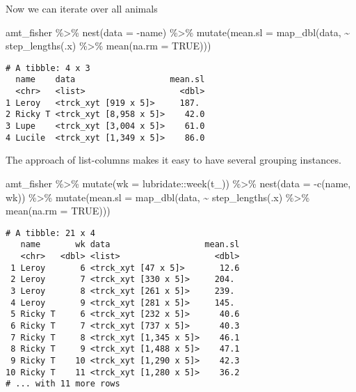 \documentclass[ignorenonframetext,,t]{beamer}
\newenvironment{Shaded}{\begin{snugshade}}{\end{snugshade}}
\newcommand{\AttributeTok}[1]{\textcolor[rgb]{0.77,0.63,0.00}{#1}}
\newcommand{\ConstantTok}[1]{\textcolor[rgb]{0.00,0.00,0.00}{#1}}
\newcommand{\FunctionTok}[1]{\textcolor[rgb]{0.00,0.00,0.00}{#1}}
\newcommand{\NormalTok}[1]{#1}
\newcommand{\SpecialCharTok}[1]{\textcolor[rgb]{0.00,0.00,0.00}{#1}}
\begin{document}
\begin{frame}[fragile]
Now we can iterate over all animals

\begin{Shaded}
\begin{Highlighting}[]
\NormalTok{amt\_fisher }\SpecialCharTok{\%\textgreater{}\%} \FunctionTok{nest}\NormalTok{(}\AttributeTok{data =} \SpecialCharTok{{-}}\NormalTok{name) }\SpecialCharTok{\%\textgreater{}\%} 
  \FunctionTok{mutate}\NormalTok{(}\AttributeTok{mean.sl =} \FunctionTok{map\_dbl}\NormalTok{(data, }\SpecialCharTok{\textasciitilde{}} \FunctionTok{step\_lengths}\NormalTok{(.x) }\SpecialCharTok{\%\textgreater{}\%} 
                             \FunctionTok{mean}\NormalTok{(}\AttributeTok{na.rm =} \ConstantTok{TRUE}\NormalTok{)))}
\end{Highlighting}
\end{Shaded}

\begin{verbatim}
# A tibble: 4 x 3
  name    data                   mean.sl
  <chr>   <list>                   <dbl>
1 Leroy   <trck_xyt [919 x 5]>     187. 
2 Ricky T <trck_xyt [8,958 x 5]>    42.0
3 Lupe    <trck_xyt [3,004 x 5]>    61.0
4 Lucile  <trck_xyt [1,349 x 5]>    86.0
\end{verbatim}
\end{frame}

\begin{frame}[fragile]
The approach of list-columns makes it easy to have several grouping
instances.

\begin{Shaded}
\begin{Highlighting}[]
\NormalTok{amt\_fisher }\SpecialCharTok{\%\textgreater{}\%} \FunctionTok{mutate}\NormalTok{(}\AttributeTok{wk =}\NormalTok{ lubridate}\SpecialCharTok{::}\FunctionTok{week}\NormalTok{(t\_)) }\SpecialCharTok{\%\textgreater{}\%} 
  \FunctionTok{nest}\NormalTok{(}\AttributeTok{data =} \SpecialCharTok{{-}}\FunctionTok{c}\NormalTok{(name, wk)) }\SpecialCharTok{\%\textgreater{}\%} 
  \FunctionTok{mutate}\NormalTok{(}\AttributeTok{mean.sl =} \FunctionTok{map\_dbl}\NormalTok{(data, }\SpecialCharTok{\textasciitilde{}} \FunctionTok{step\_lengths}\NormalTok{(.x) }\SpecialCharTok{\%\textgreater{}\%} 
                             \FunctionTok{mean}\NormalTok{(}\AttributeTok{na.rm =} \ConstantTok{TRUE}\NormalTok{)))}
\end{Highlighting}
\end{Shaded}

\begin{verbatim}
# A tibble: 21 x 4
   name       wk data                   mean.sl
   <chr>   <dbl> <list>                   <dbl>
 1 Leroy       6 <trck_xyt [47 x 5]>       12.6
 2 Leroy       7 <trck_xyt [330 x 5]>     204. 
 3 Leroy       8 <trck_xyt [261 x 5]>     239. 
 4 Leroy       9 <trck_xyt [281 x 5]>     145. 
 5 Ricky T     6 <trck_xyt [232 x 5]>      40.6
 6 Ricky T     7 <trck_xyt [737 x 5]>      40.3
 7 Ricky T     8 <trck_xyt [1,345 x 5]>    46.1
 8 Ricky T     9 <trck_xyt [1,488 x 5]>    47.1
 9 Ricky T    10 <trck_xyt [1,290 x 5]>    42.3
10 Ricky T    11 <trck_xyt [1,280 x 5]>    36.2
# ... with 11 more rows
\end{verbatim}
\end{frame}
\end{document}
